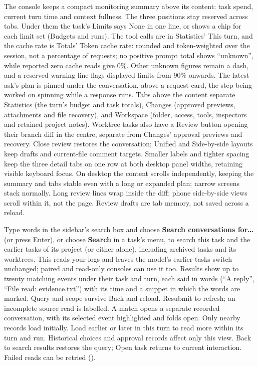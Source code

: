 The console keeps a compact monitoring summary above its content: task
spend, current turn time and context fullness. The three positions stay
reserved across tabs. Under them the task's Limits says None in one line,
or shows a chip for each limit set (Budgets and runs). The tool calls are in Statistics' This turn, and the
cache rate is Totals' Token cache rate: rounded and token-weighted over the
session, not a percentage of requests; no positive prompt total shows
``unknown'', while reported zero cache reads give 0\%. Other unknown figures
remain a dash, and a reserved warning line flags displayed limits
from 90\% onwards. The latest ask's plan is pinned under the conversation, above a request
card, the step being worked on spinning while a response runs. Tabs above
the content separate Statistics
(the turn's budget and task totals), Changes (approved previews,
attachments and file recovery), and Workspace (folder, access, tools,
inspectors and retained project notes). Worktree tasks also have a Review
button opening their branch diff in the centre, separate from Changes'
approval previews and recovery. Close review restores the conversation;
Unified and Side-by-side layouts keep drafts and current-file comment targets.
Smaller labels and tighter spacing keep the three detail tabs on one row at
both desktop panel widths, retaining visible keyboard focus. On desktop the
content scrolls independently, keeping the summary and tabs
stable even with a long or expanded plan; narrow screens stack normally.
Long review lines wrap inside the diff; phone side-by-side views scroll within
it, not the page. Review drafts are tab memory, not saved across a reload.

Type words in the sidebar's search box and choose \textbf{Search
conversations for\ldots} (or press Enter), or choose \textbf{Search} in a
task's menu, to search this task and the earlier tasks of its project (or
either alone), including archived tasks and its worktrees. This reads your logs and leaves the model's earlier-tasks switch
unchanged; paired and read-only consoles can use it too. Results show up to
twenty matching events under their task and turn, each said in words
(``A reply'', ``File read: evidence.txt'') with its time and a snippet in
which the words are marked.
Query and scope survive Back and reload. Resubmit to refresh; an incomplete
source read is labelled. A match opens a separate recorded conversation,
with its selected event highlighted and folds open. Only nearby records load
initially. Load earlier or later in this turn to read more within its turn
and run. Historical choices and approval records affect only this view.
Back to search results restores the query; Open task returns to current
interaction. Failed reads can be retried ().

